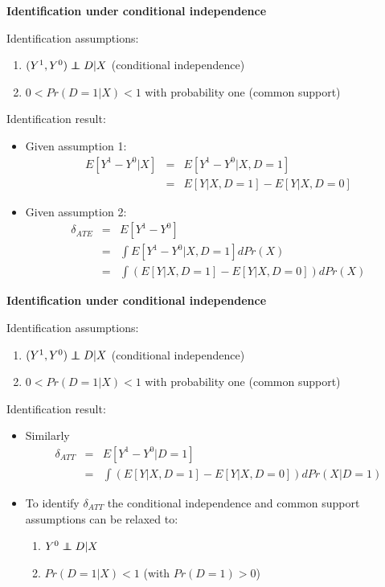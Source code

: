 \documentclass[notes=show]{beamer}
\newcommand\independent{\protect\mathpalette{\protect\independenT}{\perp}}
\def\independenT#1#2{\mathrel{\rlap{$#1#2$}\mkern2mu{#1#2}}}
\begin{document}
\begin{frame}[plain]
	\begin{center}
	\textbf{Identification under conditional independence}
	\end{center}
	
Identification assumptions:
		\begin{enumerate}
		\item $(Y^1,Y^0) \independent{D} | X$ (conditional independence)
		\item $0<Pr(D=1|X)<1$ with probability one (common support)
		\end{enumerate}
Identification result:
	\begin{itemize}
	\item Given assumption 1:
		\begin{eqnarray*}
		E[Y^1-Y^0|X] &=& E[Y^1 - Y^0 | X,D=1] \\
		&=&E[Y|X,D=1] - E[Y|X,D=0]
		\end{eqnarray*}
	\item Given assumption 2:
		\begin{eqnarray*}
		\delta_{ATE} &=&E[Y^1-Y^0] \\
		&=& \int E[Y^1 - Y^0 |X,D=1] dPr(X) \\
		&=& \int \left(E[Y|X,D=1] - E[Y|X,D=0]\right)dPr(X)
		\end{eqnarray*}
	\end{itemize}
\end{frame}

\begin{frame}[plain]
	\begin{center}
	\textbf{Identification under conditional independence}
	\end{center}
	
Identification assumptions:
		\begin{enumerate}
		\item $(Y^1,Y^0) \independent{D} | X$ (conditional independence)
		\item $0<Pr(D=1|X)<1$ with probability one (common support)
		\end{enumerate}
Identification result:
	\begin{itemize}
	\item Similarly
		\begin{eqnarray*}
		\delta_{ATT} &=&E[Y^1-Y^0 | D=1] \\
		&=& \int \left(E[Y|X,D=1] - E[Y|X,D=0]\right)dPr(X|D=1)
		\end{eqnarray*}
	\item To identify $\delta_{ATT}$ the conditional independence and common support assumptions can be relaxed to:
		\begin{enumerate}
		\item $Y^0 \independent{D} | X$ 
		\item $Pr(D=1|X)<1$ (with $Pr(D=1)>0$)
		\end{enumerate}
	\end{itemize}
\end{frame}
\end{document}
